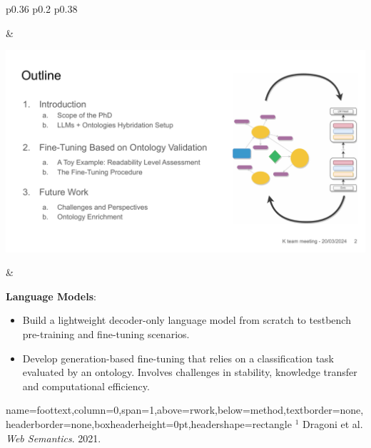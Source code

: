 \documentclass[a0paper,portrait]{baposter}
\begin{document}
\begin{poster}
{\begin{tabular}{p{0.36\textwidth} p{0.2\textwidth} p{0.38\textwidth}}
\begin{minipage}[l]{\linewidth}
\begin{itemize}
        \end{itemize}
    \end{minipage}
    &
    \begin{minipage}[c]{\linewidth}
        \begin{center}
            \includegraphics[width=0.85\linewidth]{general-idea.pdf}
        \end{center}
    \end{minipage}
    &
    \begin{minipage}[r]{\linewidth}
        \textbf{Language Models}:
        \begin{itemize}
            \item Build a lightweight decoder-only language model from scratch to testbench pre-training and fine-tuning scenarios.
            \item Develop generation-based fine-tuning that relies on a classification task evaluated by an ontology. Involves challenges in stability, knowledge transfer and computational efficiency.
        \end{itemize}
    \end{minipage}
\end{tabular}

}

\headerbox{}%
{name=foottext,column=0,span=1,above=rwork,below=method,textborder=none,headerborder=none,boxheaderheight=0pt,headershape=rectangle}{
    \vspace*{-8pt}
    {$^1$ Dragoni et al. \textsl{Web Semantics}. 2021.}
}



\end{poster}
\end{document}
